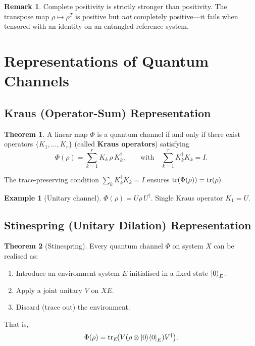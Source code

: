 \documentclass[11pt]{article}
\theoremstyle{definition}
\newtheorem{example}{Example}[section]
\newtheorem{remark}{Remark}[section]
\newtheorem{theorem}{Theorem}[section]
\begin{document}
\begin{remark}
Complete positivity is strictly stronger than positivity.  The transpose map $\rho\mapsto\rho^T$ is positive but \emph{not} completely positive---it fails when tensored with an identity on an entangled reference system.
\end{remark}

\section{Representations of Quantum Channels}

\subsection{Kraus (Operator-Sum) Representation}

\begin{theorem}
A linear map $\Phi$ is a quantum channel if and only if there exist operators $\{K_1,\dots,K_r\}$ (called \textbf{Kraus operators}) satisfying
\[
    \Phi(\rho) = \sum_{k=1}^{r}K_k\,\rho\,K_k^\dagger,
    \qquad\text{with}\quad
    \sum_{k=1}^{r}K_k^\dagger K_k = I.
\]
\end{theorem}

The trace-preserving condition $\sum_k K_k^\dagger K_k=I$ ensures $\tr(\Phi(\rho))=\tr(\rho)$.

\begin{example}[Unitary channel]
$\Phi(\rho)=U\rho\,U^\dagger$.  Single Kraus operator $K_1=U$.
\end{example}

\subsection{Stinespring (Unitary Dilation) Representation}

\begin{theorem}[Stinespring]
Every quantum channel $\Phi$ on system $X$ can be realised as:
\begin{enumerate}
    \item Introduce an environment system $E$ initialised in a fixed state $\ket{0}_E$.
    \item Apply a joint unitary $V$ on $XE$.
    \item Discard (trace out) the environment.
\end{enumerate}
That is,
\[
    \Phi(\rho) = \tr_E\!\bigl(V(\rho\otimes\ket{0}\!\bra{0}_E)V^\dagger\bigr).
\]
\end{theorem}
\end{document}

